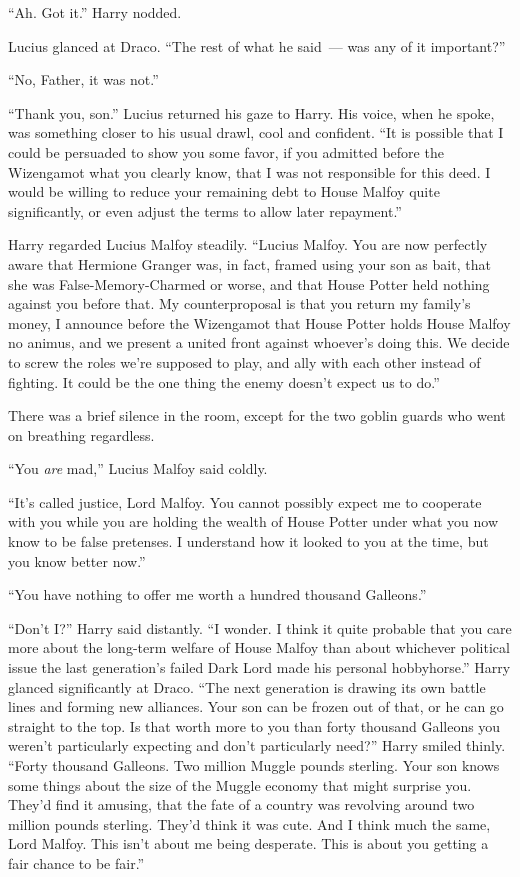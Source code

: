 ``Ah. Got it.'' Harry nodded.

Lucius glanced at Draco. ``The rest of what he said~--- was any of it important?''

``No, Father, it was not.''

``Thank you, son.'' Lucius returned his gaze to Harry. His voice, when he spoke, was something closer to his usual drawl, cool and confident. ``It is possible that I could be persuaded to show you some favor, if you admitted before the Wizengamot what you clearly know, that I was not responsible for this deed. I would be willing to reduce your remaining debt to House Malfoy quite significantly, or even adjust the terms to allow later repayment.''

Harry regarded Lucius Malfoy steadily. ``Lucius Malfoy. You are now perfectly aware that Hermione Granger was, in fact, framed using your son as bait, that she was False-Memory-Charmed or worse, and that House Potter held nothing against you before that. My counterproposal is that you return my family's money, I announce before the Wizengamot that House Potter holds House Malfoy no animus, and we present a united front against whoever's doing this. We decide to screw the roles we're supposed to play, and ally with each other instead of fighting. It could be the one thing the enemy doesn't expect us to do.''

There was a brief silence in the room, except for the two goblin guards who went on breathing regardless.

``You \emph{are} mad,'' Lucius Malfoy said coldly.

``It's called justice, Lord Malfoy. You cannot possibly expect me to cooperate with you while you are holding the wealth of House Potter under what you now know to be false pretenses. I understand how it looked to you at the time, but you know better now.''

``You have nothing to offer me worth a hundred thousand Galleons.''

``Don't I?'' Harry said distantly. ``I wonder. I think it quite probable that you care more about the long-term welfare of House Malfoy than about whichever political issue the last generation's failed Dark Lord made his personal hobbyhorse.'' Harry glanced significantly at Draco. ``The next generation is drawing its own battle lines and forming new alliances. Your son can be frozen out of that, or he can go straight to the top. Is that worth more to you than forty thousand Galleons you weren't particularly expecting and don't particularly need?'' Harry smiled thinly. ``Forty thousand Galleons. Two million Muggle pounds sterling. Your son knows some things about the size of the Muggle economy that might surprise you. They'd find it amusing, that the fate of a country was revolving around two million pounds sterling. They'd think it was cute. And I think much the same, Lord Malfoy. This isn't about me being desperate. This is about you getting a fair chance to be fair.''

